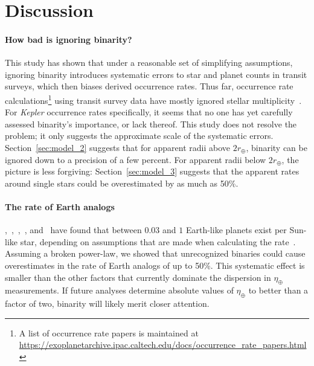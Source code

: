 \documentclass[12pt,modern]{aastex61}
\begin{document}

\section{Discussion}
\label{sec:discussion}


\paragraph{How bad is ignoring binarity?}
This study has shown that under a reasonable set of simplifying
assumptions, ignoring binarity introduces systematic errors to star
and planet counts in transit surveys, which then biases derived
occurrence rates.  Thus far, occurrence rate calculations\footnote{ A
list of occurrence rate papers is maintained at
\url{https://exoplanetarchive.ipac.caltech.edu/docs/occurrence_rate_papers.html}
} using transit survey data have mostly ignored stellar
multiplicity~\citep[\textit{e.g.},][]{howard_planet_2012,fressin_false_2013,foreman-mackey_exoplanet_2014,dressing_occurrence_2015,burke_terrestrial_2015}.
For {\it Kepler} occurrence rates specifically, it seems that no one
has yet carefully assessed binarity's importance, or lack thereof.
This study does not resolve the problem; it only suggests the
approximate scale of the systematic errors.  Section~\ref{sec:model_2}
suggests that for apparent radii above $2r_\oplus$, binarity can be
ignored down to a precision of a few percent.  For apparent radii
below $2r_\oplus$, the picture is less forgiving:
Section~\ref{sec:model_3} suggests that the apparent rates around
single stars could be overestimated by as much as 50\%.

\paragraph{The rate of Earth analogs}
\citet{youdin_exoplanet_2011},~\citet{petigura_prevalence_2013},~\citet{dong_fast_2013},~\citet{foreman-mackey_exoplanet_2014},
and~\citet{burke_terrestrial_2015} have found that between $0.03$ and
$1$ Earth-like planets exist per Sun-like star, depending on
assumptions that are made when calculating the
rate~\citep[see][Figure~17]{burke_terrestrial_2015}.  Assuming a
broken power-law, we showed that unrecognized binaries could cause
overestimates in the rate of Earth analogs of up to 50\%.  This
systematic effect is smaller than the other factors that currently
dominate the dispersion in $\eta_\oplus$ measurements.  If future
analyses determine absolute values of $\eta_\oplus$ to better than a
factor of two, binarity will likely merit closer attention.
\end{document}
